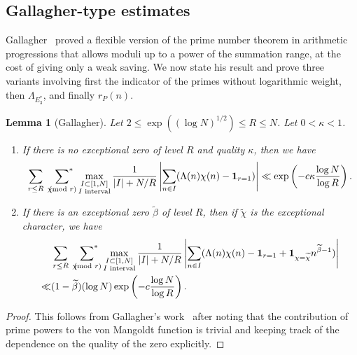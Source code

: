 \documentclass[12pt]{amsart}
\newtheorem{lemma}[theorem]{Lemma}
\theoremstyle{definition}
\theoremstyle{remark}
\numberwithin{equation}{section}
\newcommand{\asum}{\sideset{}{^{\ast}}\sum}
\newcommand{\1}{\mathbf{1}}
\let\oldpmod\pmod
\renewcommand{\pmod}[1]{\hspace{-0.12cm}\oldpmod {#1}}
\begin{document}
    

 
\subsection{Gallagher-type estimates}\label{subsec:7.2}

 Gallagher~\cite{Gal} proved a flexible version of the prime number theorem in arithmetic progressions that allows moduli up to a power of the summation range, at the cost of giving only a weak saving. We now state his result and prove three variants involving first the indicator of the primes without logarithmic weight, then $\Lambda_{E_3^*}$, and finally $r_P(n)$.


\begin{lemma}[Gallagher]\label{le:gallagher}
    Let $2\leq \exp((\log N)^{1/2}) \leq R \leq N$. Let  $0<\kappa<1$. 
    \begin{enumerate}
		\item If there is no exceptional zero of level $R$ and quality $\kappa$, then we have
		  \begin{align*}
		  \sum_{ r\leq R}\,\,\,\asum_{\chi\pmod r} \max_{\substack{I\subset [1,N]\\I \textnormal{ interval}}}\frac{1}{|I|+N/R}\left|\sum_{n\in I}(\Lambda(n)\chi(n)-\1_{r=1})\right|\ll \exp\left(-c \kappa \frac{\log N}{\log R}\right).
	       \end{align*}
		\item If there is an exceptional zero $\widetilde{\beta}$ of level $R$, then if $\widetilde{\chi}$ is the exceptional character, we have
            \begin{align*}
			    &\sum_{ r\leq R}\,\,\,\asum_{\chi\pmod r}\max_{\substack{I\subset [1,N]\\I \textnormal{ interval}}}\frac{1}{|I|+N/R} \left|\sum_{n\in I}(\Lambda(n)\chi(n)-\1_{r=1}+\1_{\chi=\widetilde{\chi}}n^{\widetilde{\beta}-1})\right|\\
                \ll& (1-\widetilde{\beta})(\log N)\exp\left(-c \frac{\log N}{\log R}\right).
		    \end{align*}
	   \end{enumerate}
\end{lemma}
	
\begin{proof}
    This follows from Gallagher's work~\cite{Gal} after noting that the contribution of prime powers to the von Mangoldt function is trivial and keeping track of the dependence on the quality of the zero explicitly.
\end{proof}
\end{document}
